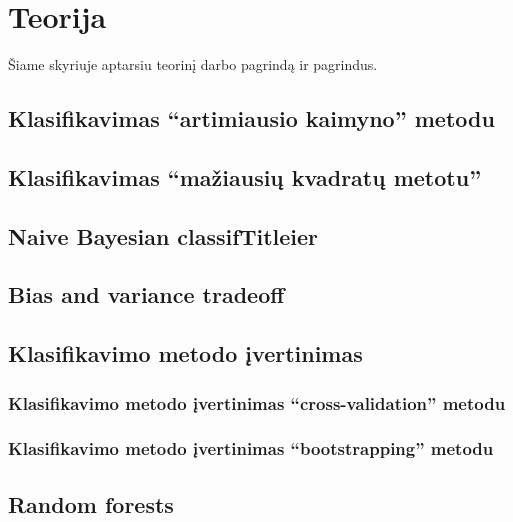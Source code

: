\documentclass{article}
\begin{document}
\let \savenumberline \numberline
\def \numberline#1{\savenumberline{#1.}}

%


\section{Teorija}
Šiame skyriuje aptarsiu teorinį darbo pagrindą ir pagrindus.

\subsection{Klasifikavimas ``artimiausio kaimyno'' metodu}
\subsection{Klasifikavimas ``mažiausių kvadratų metotu''}
\subsection{Naive Bayesian classifTitleier}
\subsection{Bias and variance tradeoff}
\subsection{Klasifikavimo metodo įvertinimas}
\subsubsection{Klasifikavimo metodo įvertinimas ``cross-validation'' metodu}
\subsubsection{Klasifikavimo metodo įvertinimas ``bootstrapping'' metodu}

\subsection{Random forests}
\end{document}
